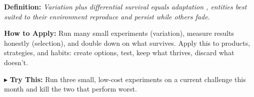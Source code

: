 \begin{tcolorbox}[title={\small \textbf{36 | Evolutionary Natural Selection}},
  colback=blue!5!white, colframe=blue!40!black,
  fonttitle=\bfseries\small, boxrule=0.5pt]
\textbf{Definition:} \textit{Variation plus differential survival equals adaptation , entities best suited to their environment reproduce and persist while others fade.}

\medskip
\textbf{How to Apply:} Run many small experiments (variation), measure results honestly (selection), and double down on what survives. Apply this to products, strategies, and habits: create options, test, keep what thrives, discard what doesn’t.

\medskip
$\blacktriangleright$ \textbf{Try This:} Run three small, low-cost experiments on a current challenge this month and kill the two that perform worst.
\end{tcolorbox}


